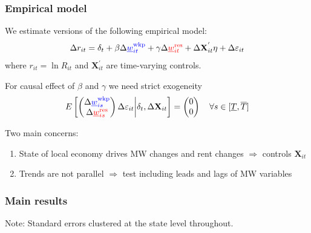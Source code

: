 \documentclass[aspectratio=169, t]{beamer}
\newcommand{\mw}{\underline{w}}
\newcommand{\wkp}{\text{wkp}}
\newcommand{\res}{\text{res}}
\begin{document}
\begin{frame}
    \frametitle{Empirical model}
        
    We estimate versions of the following empirical model:
    \[
    \Delta r_{it} = \delta_t +
        \beta \Delta {\color{blue}\mw^{\wkp}_{it}} +
        \gamma \Delta {\color{red}\mw^{\res}_{it}} + 
        \Delta \mathbf{X}^{'}_{it} \eta + 
        \Delta \varepsilon_{it} 
    \]
    where $r_{it} = \ln R_{it}$ and $\mathbf{X}^{'}_{it}$ are time-varying controls.
    
    \pause
    \vspace{3mm}
    For causal effect of $\beta$ and $\gamma$ we need strict exogeneity
    $$
    E\left[
        \begin{pmatrix}
            \Delta {\color{blue}\mw^{\wkp}_{is}} \\
            \Delta {\color{red}\mw^{\res}_{is}} \\
        \end{pmatrix}
        \Delta \varepsilon_{it}
    \bigg| \delta_t, \Delta \mathbf{X}_{it} \right] =
    \begin{pmatrix}
        0 \\
        0 \\
    \end{pmatrix}
    \quad \forall s\in[\underline T, \overline T]
    $$

    \pause
    \vspace{2mm}
    Two main concerns:
    \begin{enumerate}
        \item State of local economy drives MW changes and rent changes $\Rightarrow$ controls $\mathbf{X}_{it}$
        \item Trends are not parallel $\Rightarrow$ test including leads and lags of MW variables
    \end{enumerate}

\end{frame}

\begin{frame}[label = static]
    \frametitle{Main results}

    
    
    \vspace{2mm}
    \footnotesize
    Note: Standard errors clustered at the state level throughout.

\end{frame}
\end{document}
